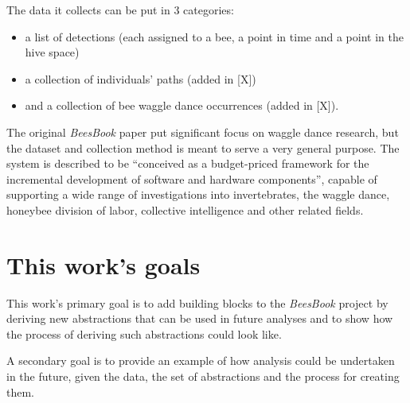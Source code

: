 The data it collects can be put in 3 categories: 
\begin{itemize}
    \item a list of detections (each assigned to a bee, a point in time and a point in the hive space) 
    \item a collection of individuals’ paths (added in [X])
    \item and a collection of bee waggle dance occurrences (added in [X]). 
\end{itemize}

The original \textit{BeesBook} paper put significant focus on waggle dance research, but the dataset and 
collection method is meant to serve a very general purpose. The system is described to be “conceived as 
a budget-priced framework for the incremental development of software and hardware components”, 
capable of supporting a wide range of investigations into invertebrates, the waggle dance, honeybee division 
of labor, collective intelligence and other related fields.



\section{This work's goals}
This work’s primary goal is to add building blocks to the \textit{BeesBook} project by deriving new abstractions
that can be used in future analyses and to show how the process of deriving such abstractions could look like.

A secondary goal is to provide an example of how analysis could be undertaken in the future, 
given the data, the set of abstractions and the process for creating them. 